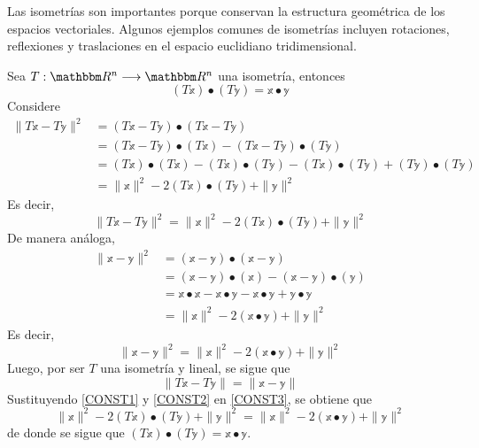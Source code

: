 Las isometrías son importantes porque conservan la estructura geométrica de los espacios vectoriales. Algunos ejemplos comunes de isometrías incluyen rotaciones, reflexiones y traslaciones en el espacio euclidiano tridimensional.

\begin{theorem}\label{YAYYYYQYQYAYGGFCXXZSSS}
    Sea $T:\RR[n] \longrightarrow \RR[n]$ una isometría, entonces
    $$(T\mathbb{x}) \bullet (T\mathbb{y}) = \mathbb{x} \bullet \mathbb{y}$$
    \demostracion Considere
    \begin{align*}
        \| T\mathbb{x} - T\mathbb{y} \|^2 & = (T\mathbb{x} - T\mathbb{y}) \bullet (T\mathbb{x} - T\mathbb{y}) \\
        & = (T\mathbb{x} - T\mathbb{y}) \bullet (T\mathbb{x}) - (T\mathbb{x} - T\mathbb{y}) \bullet (T\mathbb{y}) \\
        & = (T\mathbb{x}) \bullet (T\mathbb{x}) - (T\mathbb{x}) \bullet (T\mathbb{y}) - (T\mathbb{x}) \bullet (T\mathbb{y}) + (T\mathbb{y}) \bullet (T\mathbb{y}) \\
        & = \| \mathbb{x} \|^2 - 2(T\mathbb{x}) \bullet (T\mathbb{y}) + \| \mathbb{y} \|^2
    \end{align*}
    Es decir,
    \begin{equation}
        \| T\mathbb{x} - T\mathbb{y} \|^2 = \| \mathbb{x} \|^2 - 2(T\mathbb{x}) \bullet (T\mathbb{y}) + \| \mathbb{y} \|^2 \label{CONST1}
    \end{equation}
    De manera análoga,
    \begin{align*}
        \| \mathbb{x} - \mathbb{y} \|^2 & = (\mathbb{x} - \mathbb{y}) \bullet (\mathbb{x} - \mathbb{y}) \\
        & = (\mathbb{x} - \mathbb{y}) \bullet (\mathbb{x}) - (\mathbb{x} - \mathbb{y}) \bullet (\mathbb{y}) \\
        & = \mathbb{x} \bullet \mathbb{x} - \mathbb{x} \bullet \mathbb{y} - \mathbb{x} \bullet \mathbb{y} + \mathbb{y} \bullet \mathbb{y} \\
        & = \| \mathbb{x} \|^2 - 2(\mathbb{x} \bullet \mathbb{y}) + \| \mathbb{y} \|^2
    \end{align*}
    Es decir,
    \begin{equation}
        \| \mathbb{x} - \mathbb{y} \|^2 = \| \mathbb{x} \|^2 - 2(\mathbb{x} \bullet \mathbb{y}) + \| \mathbb{y} \|^2 \label{CONST2}
    \end{equation}
    Luego, por ser $T$ una isometría y lineal, se sigue que
    \begin{equation}
        \| T\mathbb{x} - T\mathbb{y} \| = \| \mathbb{x} - \mathbb{y} \| \label{CONST3}
    \end{equation}
    Sustituyendo \eqref{CONST1} y \eqref{CONST2} en \eqref{CONST3}, se obtiene que
    $$\| \mathbb{x} \|^2 - 2(T\mathbb{x}) \bullet (T\mathbb{y}) + \| \mathbb{y} \|^2 = \| \mathbb{x} \|^2 - 2(\mathbb{x} \bullet \mathbb{y}) + \| \mathbb{y} \|^2$$
    de donde se sigue que $(T\mathbb{x}) \bullet (T\mathbb{y}) = \mathbb{x} \bullet \mathbb{y}$.
\end{theorem}

